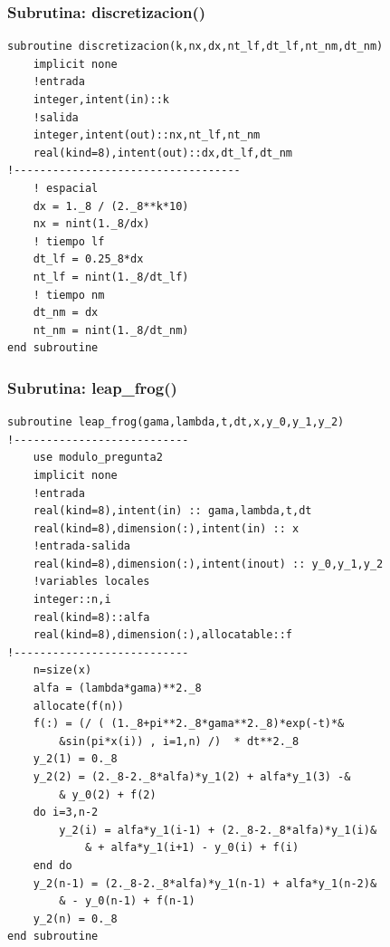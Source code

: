 \documentclass[letterpaper]{article}
\begin{document}
\subsubsection*{Subrutina: discretizacion()}
\begin{lstlisting}
subroutine discretizacion(k,nx,dx,nt_lf,dt_lf,nt_nm,dt_nm)
	implicit none
	!entrada
	integer,intent(in)::k
	!salida
	integer,intent(out)::nx,nt_lf,nt_nm
	real(kind=8),intent(out)::dx,dt_lf,dt_nm
!-----------------------------------
	! espacial
	dx = 1._8 / (2._8**k*10)
	nx = nint(1._8/dx)
	! tiempo lf
	dt_lf = 0.25_8*dx
	nt_lf = nint(1._8/dt_lf)
	! tiempo nm
	dt_nm = dx
	nt_nm = nint(1._8/dt_nm)
end subroutine
\end{lstlisting}

\subsubsection*{Subrutina: leap\_frog()}
\begin{lstlisting}
subroutine leap_frog(gama,lambda,t,dt,x,y_0,y_1,y_2)
!---------------------------
	use modulo_pregunta2
	implicit none
	!entrada
	real(kind=8),intent(in)	:: gama,lambda,t,dt
	real(kind=8),dimension(:),intent(in) :: x
	!entrada-salida
	real(kind=8),dimension(:),intent(inout) :: y_0,y_1,y_2
	!variables locales
	integer::n,i
	real(kind=8)::alfa
	real(kind=8),dimension(:),allocatable::f
!---------------------------
	n=size(x)
	alfa = (lambda*gama)**2._8
	allocate(f(n))
	f(:) = (/ ( (1._8+pi**2._8*gama**2._8)*exp(-t)*&
		&sin(pi*x(i)) , i=1,n) /)  * dt**2._8
	y_2(1) = 0._8
	y_2(2) = (2._8-2._8*alfa)*y_1(2) + alfa*y_1(3) -&
		& y_0(2) + f(2)
	do i=3,n-2
		y_2(i) = alfa*y_1(i-1) + (2._8-2._8*alfa)*y_1(i)&
			& + alfa*y_1(i+1) - y_0(i) + f(i)
	end do
	y_2(n-1) = (2._8-2._8*alfa)*y_1(n-1) + alfa*y_1(n-2)&
		& - y_0(n-1) + f(n-1)
	y_2(n) = 0._8
end subroutine
\end{lstlisting}
\end{document}
